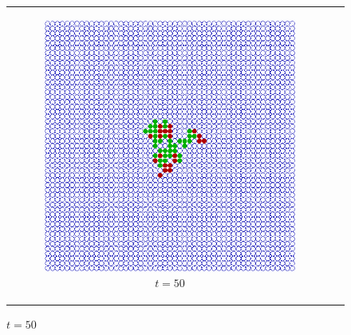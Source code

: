\begin{figure}
\begin{center}
	\begin{tabular}{c c}
		\begin{subfigure}[b]{0.4\textwidth}
			\centering
			\includegraphics[width=1\textwidth, angle=0]{./fig/sir/vis/51x51agents_t50_01dt.png}
			\caption{$t = 50$}
			\label{fig:vis_51x51agents_t50_01dt}
		\end{subfigure}
    	
    	&
  

\end{tabular}
\end{center}
\end{figure}
